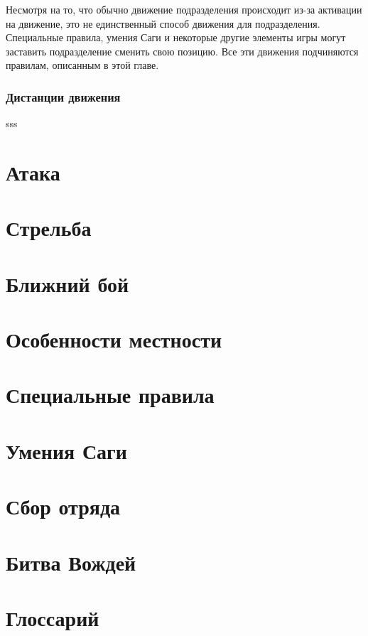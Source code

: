 \documentclass[a4paper,11pt,twoside]{article}
\begin{document}
Несмотря на то, что обычно движение подразделения происходит из-за активации на движение, это не единственный способ движения для подразделения. Специальные правила, умения Саги и некоторые другие элементы игры могут заставить подразделение сменить свою позицию. Все эти движения подчиняются правилам, описанным в этой главе.

\section*{Дистанции движения}
sss

\part{Атака}
\part{Стрельба}
\part{Ближний бой}
\part{Особенности местности}
\part{Специальные правила}
\part{Умения Саги}
\part{Сбор отряда}
\part{Битва Вождей}
\part{Глоссарий}
\end{document}
